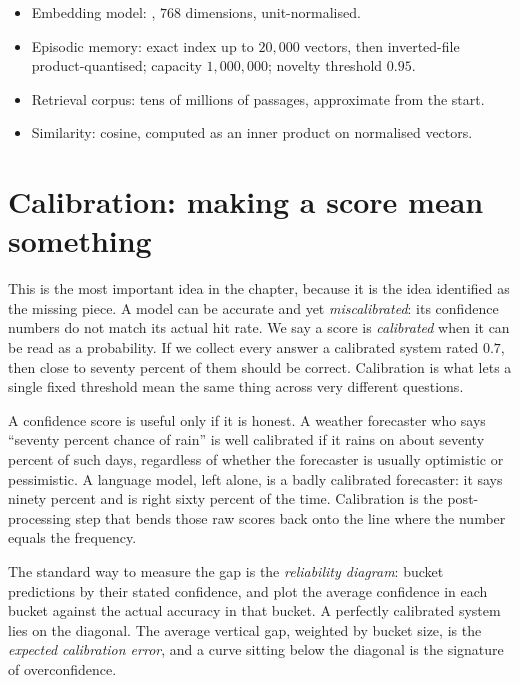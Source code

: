 \begin{bythenumbers}
\begin{itemize}[leftmargin=1.3em, itemsep=1pt]
  \item Embedding model: , $768$ dimensions, unit-normalised.
  \item Episodic memory: exact index up to $20{,}000$ vectors, then inverted-file
  product-quantised; capacity $1{,}000{,}000$; novelty threshold $0.95$.
  \item Retrieval corpus: tens of millions of passages, approximate from the start.
  \item Similarity: cosine, computed as an inner product on normalised vectors.
\end{itemize}
\end{bythenumbers}

\section{Calibration: making a score mean something}
\label{sec:prereq-calibration}

This is the most important idea in the chapter, because it is the idea
 identified as the missing piece. A model can be accurate and yet
\emph{miscalibrated}: its confidence numbers do not match its actual hit rate. We
say a score is \emph{calibrated} when it can be read as a probability. If we
collect every answer a calibrated system rated $0.7$, then close to seventy
percent of them should be correct. Calibration is what lets a single fixed
threshold mean the same thing across very different questions.

\begin{intuition}
A confidence score is useful only if it is honest. A weather forecaster who says
``seventy percent chance of rain'' is well calibrated if it rains on about seventy
percent of such days, regardless of whether the forecaster is usually optimistic or
pessimistic. A language model, left alone, is a badly calibrated forecaster: it
says ninety percent and is right sixty percent of the time. Calibration is the
post-processing step that bends those raw scores back onto the line where the
number equals the frequency.
\end{intuition}

The standard way to measure the gap is the \emph{reliability diagram}: bucket
predictions by their stated confidence, and plot the average confidence in each
bucket against the actual accuracy in that bucket. A perfectly calibrated system
lies on the diagonal. The average vertical gap, weighted by bucket size, is the
\emph{expected calibration error}, and a curve sitting below the diagonal is the
signature of overconfidence.

